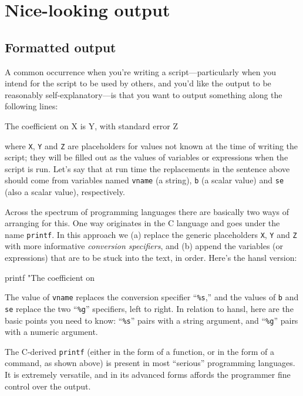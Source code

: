 \chapter{Nice-looking output}
\label{chap:formatting}

\section{Formatted output}
\label{sec:printf}

A common occurrence when you're writing a script---particularly when
you intend for the script to be used by others, and you'd like the
output to be reasonably self-explanatory---is that you want to output
something along the following lines:
\begin{code}
The coefficient on X is Y, with standard error Z
\end{code}
where \texttt{X}, \texttt{Y} and \texttt{Z} are placeholders for
values not known at the time of writing the script; they will be
filled out as the values of variables or expressions when the script
is run. Let's say that at run time the replacements in the sentence
above should come from variables named \texttt{vname} (a string),
\texttt{b} (a scalar value) and \texttt{se} (also a scalar value),
respectively.

Across the spectrum of programming languages there are basically two
ways of arranging for this. One way originates in the \textsf{C}
language and goes under the name \texttt{printf}. In this approach we
(a) replace the generic placeholders \texttt{X}, \texttt{Y} and
\texttt{Z} with more informative \textit{conversion specifiers}, and
(b) append the variables (or expressions) that are to be stuck into
the text, in order. Here's the hansl version:
\begin{code}
printf "The coefficient on %
\end{code}
The value of \texttt{vname} replaces the conversion specifier
``\texttt{\%s},'' and the values of \texttt{b} and \texttt{se} replace
the two ``\texttt{\%g}'' specifiers, left to right. In relation to
hansl, here are the basic points you need to know: ``\texttt{\%s}''
pairs with a string argument, and ``\texttt{\%g}'' pairs with a
numeric argument.

The \textsf{C}-derived \texttt{printf} (either in the form of a
function, or in the form of a command, as shown above) is present in
most ``serious'' programming languages. It is extremely versatile, and
in its advanced forms affords the programmer fine control over
the output.


